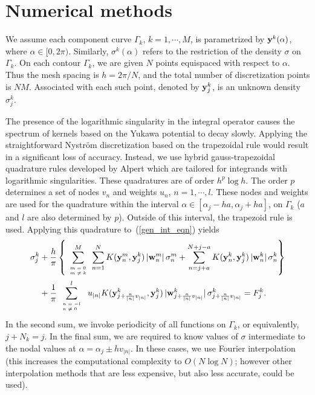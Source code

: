 \documentclass[preprint,12pt]{elsarticle}
\newcommand{\y}{{\bf y}}
\newcommand{\w}{{\bf w}}
\newcommand{\eqr}[1]{~(\ref{#1})}
\begin{document}
\section{Numerical methods}
We assume each component curve $\Gamma_k$, $k=1,\cdots, M$, is
parametrized by $\y^k(\alpha)$, where $\alpha \in [0, 2\pi)$. Similarly, $\sigma^k(\alpha)$ refers to the restriction of the density $\sigma$ on $\Gamma_k$.
On each
contour $\Gamma_k$, we are given $N$ points equispaced with respect
to $\alpha$. Thus the mesh spacing is $h = 2\pi/N$, and the total
number of discretization points is $N M$. Associated with each
such point, denoted by $\y^k_j$, is an unknown density $\sigma^k_j$.

The presence of the logarithmic singularity in the integral operator causes the spectrum of kernels based on the Yukawa potential to decay slowly. 
Applying the straightforward
Nystr\"{o}m discretization based on the trapezoidal rule would result in a significant loss of accuracy.
Instead, we use 
hybrid gauss-trapezoidal quadrature rules developed by Alpert \cite{alpert:quad:rules} which are tailored for integrands with logarithmic singularities. 
These quadratures are of order $h^p \log h$. The order $p$ determines a set of nodes $v_n$ and weights  $u_n$, $n=1, \cdots,  l$.
These nodes and weights are used for the quadrature within the interval $\alpha \in [\alpha_j- h a, \alpha_j+h a]$, on $\Gamma_k$ ($a$ and $l$ are also determined by $p$). 
Outside of this interval, the trapezoid rule is used.
Applying this quadrature to\eqr{gen_int_eqn} yields
\begin{align}
    \sigma_j^k & + \frac{h}{\pi} \left\{
    \sum_{\tiny{\begin{array}{l}
                             m=0  \\
                            m \ne k
                 \end{array} }
                }^M  \sum_{n=1}^{N} K(\y^m_n,\y^k_j)\, |\w^m_n| \, \sigma^m_n 
    + \sum_{n=j+a}^{N + j-a} K(\y^k_n,\y^k_j)\, |\w^k_n| \, \sigma^k_n  \right\}  
                         \nonumber \\
    &   + \frac{1}{\pi} \sum_{\tiny{ \begin{array}{l}
                             n=-l  \\
                            n \ne 0
                         \end{array} }}^l \, u_{|n|} 
             K(\y^k_{j + \frac{ n}{|n|} v_{|n|}}, \y^k_j ) 
            \, |\w^k_{j + \frac{ n}{|n|} v_{|n|}  } | \, \sigma^k_{j + \frac{n}{|n|} v_{|n|}} 
             =  F_j^k.          
             \label{discrete_sys}
\end{align}
In the second sum, we invoke periodicity of all functions on $\Gamma_k$, or equivalently, $j+N_k = j$. In the final sum, we are required to know values of $\sigma$ intermediate to the nodal values at $\alpha=\alpha_j \pm h v_{|n|}$. 
In these cases, we use Fourier interpolation (this increases the computational complexity to $O(N\log N)$; however other interpolation methods that are less expensive, but also less accurate, could be used).
\end{document}
